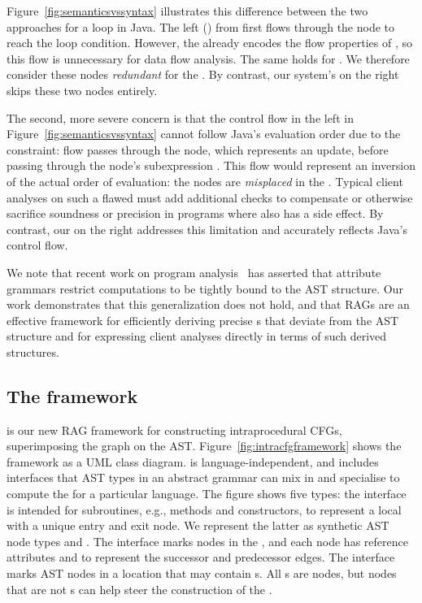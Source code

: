 Figure~\ref{fig:semanticsvssyntax} illustrates this difference between the two approaches for a  loop in Java.
The left (\ParentFirst) {\CFG} from {\jastaddjintraflow} first flows through the  node to reach the loop condition.
However, the {\CFG} already encodes the flow properties of , so this flow is unnecessary for data flow analysis.
The same holds for .
We therefore consider these nodes \emph{redundant} for the {\CFG}.
By contrast, our system's {\ASTUnrestricted} {\CFG} on the right skips these two nodes entirely.


The second, more severe concern is that the control flow
in the left {\CFG} in Figure~\ref{fig:semanticsvssyntax} cannot follow Java's evaluation order due to the {\ParentFirst} constraint:
flow passes through the  node, which represents an update, before passing through the node's subexpression .
This flow would represent an inversion of the actual order of evaluation: the nodes are \emph{misplaced} in the {\CFG}.
Typical client analyses on such a flawed {\CFG} must add additional checks to compensate or otherwise sacrifice soundness or precision in programs where  also has a side effect.
By contrast, our {\ASTUnrestricted} {\CFG} on the right addresses this limitation and accurately reflects Java's control flow.

We note that recent work on program analysis~\cite{szaboincrementalizing,helm2020modular} has asserted that attribute grammars restrict computations to be tightly bound to the AST structure.
Our work demonstrates that this generalization does not hold, and that RAGs are an effective framework for efficiently deriving precise {\CFG}s that deviate from the AST structure and for expressing client analyses directly in terms of such derived structures.


\subsection{The {\intracfg} framework}
{\intracfg} is our new RAG framework for constructing intraprocedural {\ASTUnrestricted} CFGs, superimposing the graph on the AST.
Figure~\ref{fig:intracfgframework} shows the framework as a UML class diagram.
{\intracfg} is language-independent, and includes interfaces that AST types in an abstract grammar can mix in and specialise to compute the {\CFG} for a particular language.
The figure shows five types:
the  interface is intended for subroutines, e.g., methods and constructors, to represent a local {\CFG} with a unique entry and exit node.
  We represent the latter as synthetic AST node types  and .
The  interface marks nodes in the {\CFG}, and each node has reference attributes  and  to represent the successor and predecessor edges.
The  interface marks AST nodes in a location that may contain s.
All s are  nodes, but  nodes that are not s can help steer the construction of the {\CFG}.


